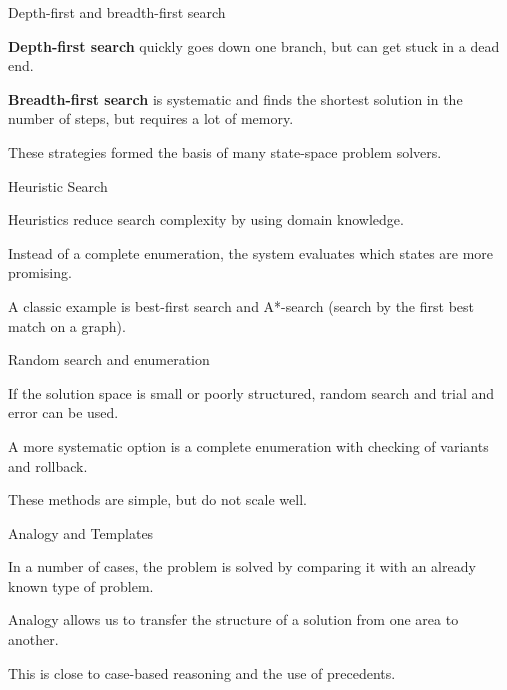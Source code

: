 \begin{frame}{Depth-first and breadth-first search}
	\topline
	\justifying
	
	\begin{textitemize}
		\item \textbf{Depth-first search} quickly goes down one branch, but can get stuck in a dead end.
		\item \textbf{Breadth-first search} is systematic and finds the shortest solution in the number of steps, but requires a lot of memory.
		\item These strategies formed the basis of many state-space problem solvers.
	\end{textitemize}
\end{frame}

\begin{frame}{Heuristic Search}
	\topline
	\justifying
	
	\begin{textitemize}
		\item Heuristics reduce search complexity by using domain knowledge.
		\item Instead of a complete enumeration, the system evaluates which states are more promising.
		\item A classic example is best-first search and A*-search (search by the first best match on a graph).
	\end{textitemize}
\end{frame}

\begin{frame}{Random search and enumeration}
	\topline
	\justifying
	
	\begin{textitemize}
		\item If the solution space is small or poorly structured, random search and trial and error can be used.
		\item A more systematic option is a complete enumeration with checking of variants and rollback.
		\item These methods are simple, but do not scale well.
	\end{textitemize}
\end{frame}

\begin{frame}{Analogy and Templates}
	\topline
	\justifying
	
	\begin{textitemize}
		\item In a number of cases, the problem is solved by comparing it with an already known type of problem.
		\item Analogy allows us to transfer the structure of a solution from one area to another.
		\item This is close to case-based reasoning and the use of precedents.
	\end{textitemize}
\end{frame}

